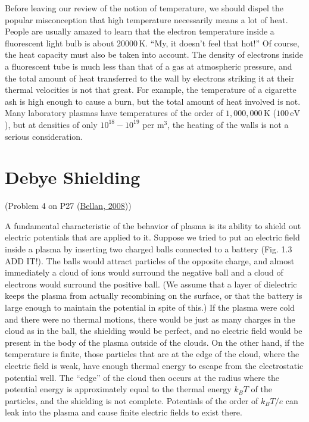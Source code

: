 \documentclass[
  notoc %
]{tufte-book}
\begin{document}
Before leaving our review of the notion of temperature, we should dispel
the popular misconception that high temperature necessarily means a lot
of heat. People are usually amazed to learn that the electron
temperature inside a fluorescent light bulb is about
\(20000\, \text{K}\). ``My, it doesn't feel that hot!'' Of course, the
heat capacity must also be taken into account. The density of electrons
inside a fluorescent tube is much less than that of a gas at atmospheric
pressure, and the total amount of heat transferred to the wall by
electrons striking it at their thermal velocities is not that great. For
example, the temperature of a cigarette ash is high enough to cause a
burn, but the total amount of heat involved is not. Many laboratory
plasmas have temperatures of the order of \(1,000,000\,\text{K}\)
(\(100\,\text{eV}\)), but at densities of only \(10^{18}-10^{19}\) per
\(\text{m}^3\), the heating of the walls is not a serious consideration.

\hypertarget{sec:debye}{%
\section{Debye Shielding}\label{sec:debye}}

(Problem 4 on P27
(\protect\hyperlink{ref-bellan2008fundamentals}{Bellan, 2008}))

A fundamental characteristic of the behavior of plasma is its ability to
shield out electric potentials that are applied to it. Suppose we tried
to put an electric field inside a plasma by inserting two charged balls
connected to a battery (Fig. 1.3 ADD IT!). The balls would attract
particles of the opposite charge, and almost immediately a cloud of ions
would surround the negative ball and a cloud of electrons would surround
the positive ball. (We assume that a layer of dielectric keeps the
plasma from actually recombining on the surface, or that the battery is
large enough to maintain the potential in spite of this.) If the plasma
were cold and there were no thermal motions, there would be just as many
charges in the cloud as in the ball, the shielding would be perfect, and
no electric field would be present in the body of the plasma outside of
the clouds. On the other hand, if the temperature is finite, those
particles that are at the edge of the cloud, where the electric field is
weak, have enough thermal energy to escape from the electrostatic
potential well. The ``edge'' of the cloud then occurs at the radius
where the potential energy is approximately equal to the thermal energy
\(k_BT\) of the particles, and the shielding is not complete. Potentials
of the order of \(k_BT/e\) can leak into the plasma and cause finite
electric fields to exist there.
\end{document}
